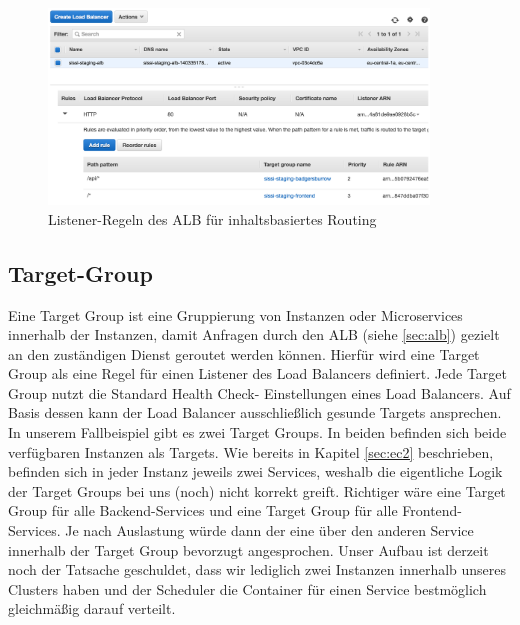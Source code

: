 \begin{figure}[!ht]
  \centering
  \includegraphics[width=0.9\textwidth]{images/routing.png}
  \caption{Listener-Regeln des ALB für inhaltsbasiertes Routing}
\end{figure}

\subsection{Target-Group}
\label{sec:target-group}
Eine Target Group ist eine Gruppierung von Instanzen oder Microservices innerhalb der Instanzen, damit Anfragen durch den ALB (siehe \ref{sec:alb}) gezielt an den zuständigen Dienst geroutet werden können. Hierfür wird eine Target Group als eine Regel für einen Listener des Load Balancers definiert. Jede Target Group nutzt die Standard Health Check- Einstellungen eines Load Balancers. Auf Basis dessen kann der Load Balancer ausschließlich gesunde Targets ansprechen. \cite{aws:target} \\

In unserem Fallbeispiel gibt es zwei Target Groups. In beiden befinden sich beide verfügbaren Instanzen als Targets. Wie bereits in Kapitel \ref{sec:ec2} beschrieben, befinden sich in jeder Instanz jeweils zwei Services, weshalb die eigentliche Logik der Target Groups bei uns (noch) nicht korrekt greift. Richtiger wäre eine Target Group für alle Backend-Services und eine Target Group für alle Frontend-Services. Je nach Auslastung würde dann der eine über den anderen Service innerhalb der Target Group bevorzugt angesprochen. Unser Aufbau ist derzeit noch der Tatsache geschuldet, dass wir lediglich zwei Instanzen innerhalb unseres Clusters haben und der Scheduler die Container für einen Service bestmöglich gleichmäßig darauf verteilt.


